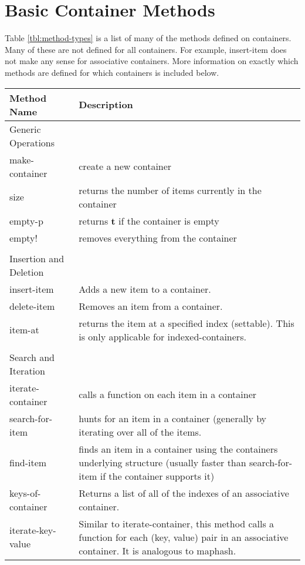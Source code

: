 \documentclass{acm_proc_article-sp}
\begin{document}
\section{Basic Container Methods}
Table \ref{tbl:method-types} is a list of many of the methods defined on
containers. Many of these are not defined for all containers. For
example, insert-item does not make any sense for
associative containers. More information on exactly which methods are
defined for which containers is included below.

\begin{table*}[htb]
\begin{center}
\begin{tabular}{|l|p{4 in}|} \hline
Method Name & Description \\ \hline \hline

Generic Operations & \\ \hline
make-container & create a new container \\
size & returns the number of items currently in the container \\
empty-p & returns {\bf t} if the container is empty \\
empty! & removes everything from the container \\


& \\ \hline
Insertion and Deletion & \\ \hline
insert-item & Adds a new item to a container. \\
delete-item & Removes an item from a container. \\
item-at & returns the item at a specified index (settable). This is only
applicable for indexed-containers. \\

& \\ \hline
Search and Iteration & \\ \hline
iterate-container & calls a function on each item in a container \\

search-for-item & hunts for an item in a container (generally by
iterating over all of the items. \\ 

find-item & finds an item in a
container using the containers underlying structure (usually faster than
search-for-item if the container supports it) \\

keys-of-container & Returns a list of all of the indexes of an
associative container. \\ 
iterate-key-value & Similar to
iterate-container, this method calls a function for each (key, value)
pair in an associative container. It is analogous to maphash. \\


\end{tabular}
\end{center}
\end{table*}
\end{document}
